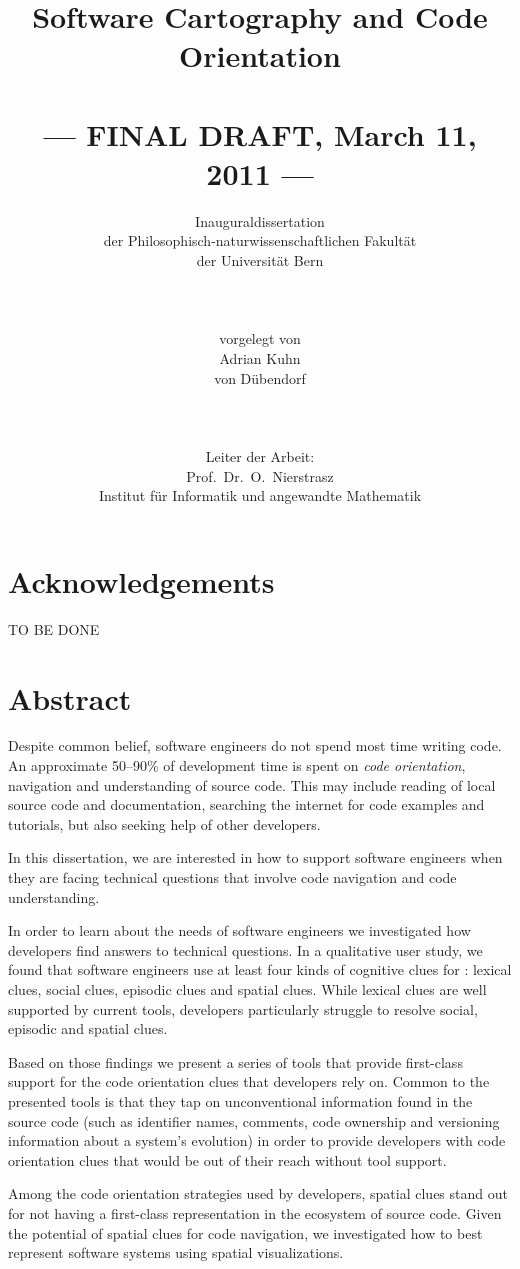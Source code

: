 \documentclass[10pt]{book}
\title{Software Cartography and Code Orientation\\~\\--- FINAL DRAFT, March 11, 2011 ---}
\author{Inauguraldissertation\\
der Philosophisch-naturwissenschaftlichen Fakult\"at\\
der Universit\"at Bern\\
\\
\\
\\
vorgelegt von\\
Adrian Kuhn\\
von D\"ubendorf\\ 
\\
\\
\\
Leiter der Arbeit:\\
Prof.\ Dr.\ O.\ Nierstrasz\\ 
Institut f\"ur Informatik und angewandte Mathematik}
\date{}
\begin{document}
\maketitle

\chapter*{Acknowledgements}
TO BE DONE

\chapter*{Abstract}

Despite common belief, software engineers do not spend most time writing code. An approximate 50--90\% of development time is spent on \emph{code orientation}, \ie navigation and understanding of source code. This may include reading of local source code and documentation, searching the internet for code examples and tutorials, but also seeking help of other developers. 

In this dissertation, we are interested in how to support software engineers when they are facing technical questions that involve code navigation and code understanding. 

In order to learn about the \codenavigation needs of software engineers we investigated how developers find answers to technical questions. In a qualitative user study, we found that software engineers use at least four kinds of cognitive clues for \codenavigation: 
	lexical clues, 
	social clues, 
	episodic clues 
	and spatial clues.
While lexical clues are well supported by current tools, developers particularly struggle to resolve social, episodic and spatial clues. 

Based on those findings we present a series of tools that provide first-class support for the code orientation clues that developers rely on. Common to the presented tools is that they tap on unconventional information found in the source code (such as identifier names, comments, code ownership and versioning information about a system's evolution) in order to provide developers with code orientation clues that would be out of their reach without tool support.

Among the code orientation strategies used by developers, spatial clues stand out for not having a first-class representation in the ecosystem of source code. Given the potential of spatial clues for code navigation, we investigated how to best represent software systems using spatial visualizations. 
\end{document}
